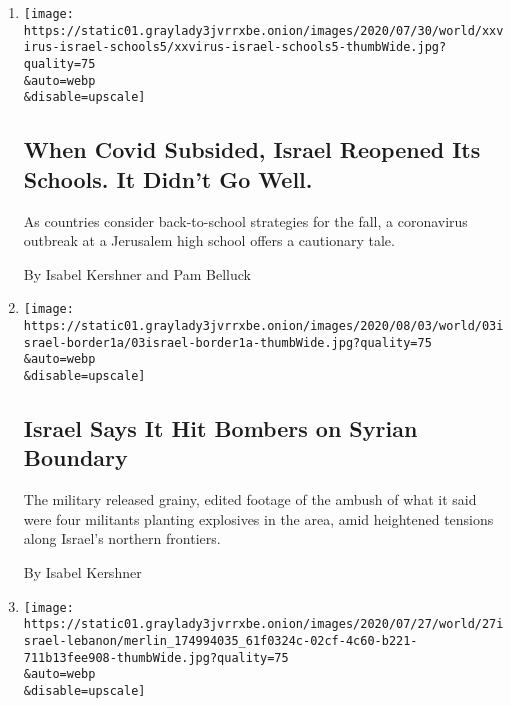 \begin{enumerate}
\def\labelenumi{\arabic{enumi}.}
\item
  \href{/2020/08/04/world/middleeast/coronavirus-israel-schools-reopen.html}{}

  \texttt{[image: https://static01.graylady3jvrrxbe.onion/images/2020/07/30/world/xxvirus-israel-schools5/xxvirus-israel-schools5-thumbWide.jpg?quality=75\\\&auto=webp\\\&disable=upscale]}

  \hypertarget{when-covid-subsided-israel-reopened-its-schools-it-didnt-go-well}{%
  \subsection{When Covid Subsided, Israel Reopened Its Schools. It
  Didn't Go
  Well.}\label{when-covid-subsided-israel-reopened-its-schools-it-didnt-go-well}}

  As countries consider back-to-school strategies for the fall, a
  coronavirus outbreak at a Jerusalem high school offers a cautionary
  tale.

  By Isabel Kershner and Pam Belluck
\item
  \href{/2020/08/03/world/middleeast/israel-syria-border.html}{}

  \texttt{[image: https://static01.graylady3jvrrxbe.onion/images/2020/08/03/world/03israel-border1a/03israel-border1a-thumbWide.jpg?quality=75\\\&auto=webp\\\&disable=upscale]}

  \hypertarget{israel-says-it-hit-bombers-on-syrian-boundary}{%
  \subsection{Israel Says It Hit Bombers on Syrian
  Boundary}\label{israel-says-it-hit-bombers-on-syrian-boundary}}

  The military released grainy, edited footage of the ambush of what it
  said were four militants planting explosives in the area, amid
  heightened tensions along Israel's northern frontiers.

  By Isabel Kershner
\item
  \href{/2020/07/27/world/middleeast/israel-hezbollah-lebanon-fighting.html}{}

  \texttt{[image: https://static01.graylady3jvrrxbe.onion/images/2020/07/27/world/27israel-lebanon/merlin\_174994035\_61f0324c-02cf-4c60-b221-711b13fee908-thumbWide.jpg?quality=75\\\&auto=webp\\\&disable=upscale]}

  \hypertarget{israel-says-it-thwarted-a-hezbollah-raid-at-lebanon-border}{%
}
\end{enumerate}
